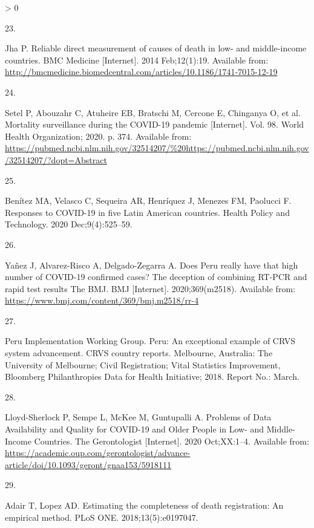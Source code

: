 \documentclass[
]{article}
\newlength{\cslhangindent}
\newlength{\csllabelwidth}
\newenvironment{CSLReferences}[2] %
 {%
  \setlength{\parindent}{0pt}
  \ifodd #1 \everypar{\setlength{\hangindent}{\cslhangindent}}\ignorespaces\fi
  \ifnum #2 > 0
  \setlength{\parskip}{#2\baselineskip}
  \fi
 }%
 {}
\newcommand{\CSLLeftMargin}[1]{\parbox[t]{\csllabelwidth}{#1}}
\newcommand{\CSLRightInline}[1]{\parbox[t]{\linewidth - \csllabelwidth}{#1}\break}
\begin{document}
\begin{CSLReferences}{0}{0}
\leavevmode\hypertarget{ref-Jha2014}{}%
\CSLLeftMargin{23. }
\CSLRightInline{Jha P. {Reliable direct measurement of causes of death in low- and middle-income countries}. BMC Medicine {[}Internet{]}. 2014 Feb;12(1):19. Available from: \url{http://bmcmedicine.biomedcentral.com/articles/10.1186/1741-7015-12-19}}

\leavevmode\hypertarget{ref-Setel2020}{}%
\CSLLeftMargin{24. }
\CSLRightInline{Setel P, Abouzahr C, Atuheire EB, Bratschi M, Cercone E, Chinganya O, et al. {Mortality surveillance during the COVID-19 pandemic} {[}Internet{]}. Vol. 98. World Health Organization; 2020. p. 374. Available from: \url{https://pubmed.ncbi.nlm.nih.gov/32514207/\%20https://pubmed.ncbi.nlm.nih.gov/32514207/?dopt=Abstract}}

\leavevmode\hypertarget{ref-Benitez2020}{}%
\CSLLeftMargin{25. }
\CSLRightInline{Benítez MA, Velasco C, Sequeira AR, Henríquez J, Menezes FM, Paolucci F. {Responses to COVID-19 in five Latin American countries}. Health Policy and Technology. 2020 Dec;9(4):525--59. }

\leavevmode\hypertarget{ref-Yanez2020}{}%
\CSLLeftMargin{26. }
\CSLRightInline{Yañez J, Alvarez-Risco A, Delgado-Zegarra A. {Does Peru really have that high number of COVID-19 confirmed cases? The deception of combining RT-PCR and rapid test results \textbar{} The BMJ}. BMJ {[}Internet{]}. 2020;369(m2518). Available from: \url{https://www.bmj.com/content/369/bmj.m2518/rr-4}}

\leavevmode\hypertarget{ref-CRVS2018}{}%
\CSLLeftMargin{27. }
\CSLRightInline{{Peru Implementation Working Group. Peru: An exceptional example of CRVS system advancement. CRVS country reports.} Melbourne, Australia: The University of Melbourne; Civil Registration; Vital Statistics Improvement, Bloomberg Philanthropies Data for Health Initiative; 2018. Report No.: March. }

\leavevmode\hypertarget{ref-Lloyd2020}{}%
\CSLLeftMargin{28. }
\CSLRightInline{Lloyd-Sherlock P, Sempe L, McKee M, Guntupalli A. {Problems of Data Availability and Quality for COVID-19 and Older People in Low- and Middle-Income Countries}. The Gerontologist {[}Internet{]}. 2020 Oct;XX:1--4. Available from: \url{https://academic.oup.com/gerontologist/advance-article/doi/10.1093/geront/gnaa153/5918111}}

\leavevmode\hypertarget{ref-Adair2018}{}%
\CSLLeftMargin{29. }
\CSLRightInline{Adair T, Lopez AD. {Estimating the completeness of death registration: An empirical method.} PLoS ONE. 2018;13(5):e0197047. }


\end{CSLReferences}
\end{document}
